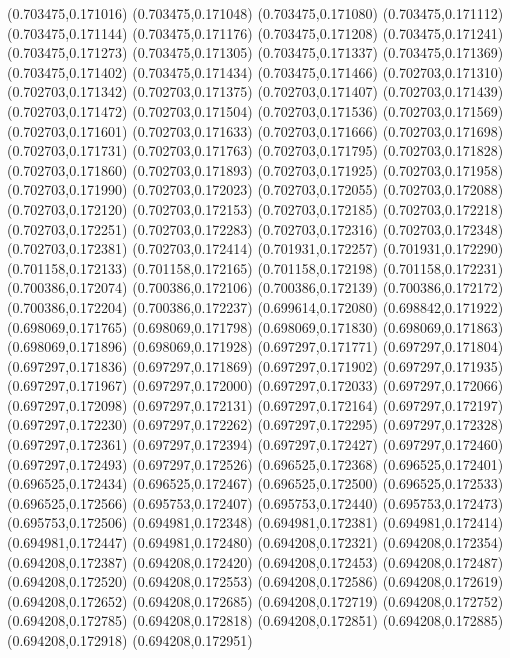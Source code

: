(0.703475,0.171016)
(0.703475,0.171048)
(0.703475,0.171080)
(0.703475,0.171112)
(0.703475,0.171144)
(0.703475,0.171176)
(0.703475,0.171208)
(0.703475,0.171241)
(0.703475,0.171273)
(0.703475,0.171305)
(0.703475,0.171337)
(0.703475,0.171369)
(0.703475,0.171402)
(0.703475,0.171434)
(0.703475,0.171466)
(0.702703,0.171310)
(0.702703,0.171342)
(0.702703,0.171375)
(0.702703,0.171407)
(0.702703,0.171439)
(0.702703,0.171472)
(0.702703,0.171504)
(0.702703,0.171536)
(0.702703,0.171569)
(0.702703,0.171601)
(0.702703,0.171633)
(0.702703,0.171666)
(0.702703,0.171698)
(0.702703,0.171731)
(0.702703,0.171763)
(0.702703,0.171795)
(0.702703,0.171828)
(0.702703,0.171860)
(0.702703,0.171893)
(0.702703,0.171925)
(0.702703,0.171958)
(0.702703,0.171990)
(0.702703,0.172023)
(0.702703,0.172055)
(0.702703,0.172088)
(0.702703,0.172120)
(0.702703,0.172153)
(0.702703,0.172185)
(0.702703,0.172218)
(0.702703,0.172251)
(0.702703,0.172283)
(0.702703,0.172316)
(0.702703,0.172348)
(0.702703,0.172381)
(0.702703,0.172414)
(0.701931,0.172257)
(0.701931,0.172290)
(0.701158,0.172133)
(0.701158,0.172165)
(0.701158,0.172198)
(0.701158,0.172231)
(0.700386,0.172074)
(0.700386,0.172106)
(0.700386,0.172139)
(0.700386,0.172172)
(0.700386,0.172204)
(0.700386,0.172237)
(0.699614,0.172080)
(0.698842,0.171922)
(0.698069,0.171765)
(0.698069,0.171798)
(0.698069,0.171830)
(0.698069,0.171863)
(0.698069,0.171896)
(0.698069,0.171928)
(0.697297,0.171771)
(0.697297,0.171804)
(0.697297,0.171836)
(0.697297,0.171869)
(0.697297,0.171902)
(0.697297,0.171935)
(0.697297,0.171967)
(0.697297,0.172000)
(0.697297,0.172033)
(0.697297,0.172066)
(0.697297,0.172098)
(0.697297,0.172131)
(0.697297,0.172164)
(0.697297,0.172197)
(0.697297,0.172230)
(0.697297,0.172262)
(0.697297,0.172295)
(0.697297,0.172328)
(0.697297,0.172361)
(0.697297,0.172394)
(0.697297,0.172427)
(0.697297,0.172460)
(0.697297,0.172493)
(0.697297,0.172526)
(0.696525,0.172368)
(0.696525,0.172401)
(0.696525,0.172434)
(0.696525,0.172467)
(0.696525,0.172500)
(0.696525,0.172533)
(0.696525,0.172566)
(0.695753,0.172407)
(0.695753,0.172440)
(0.695753,0.172473)
(0.695753,0.172506)
(0.694981,0.172348)
(0.694981,0.172381)
(0.694981,0.172414)
(0.694981,0.172447)
(0.694981,0.172480)
(0.694208,0.172321)
(0.694208,0.172354)
(0.694208,0.172387)
(0.694208,0.172420)
(0.694208,0.172453)
(0.694208,0.172487)
(0.694208,0.172520)
(0.694208,0.172553)
(0.694208,0.172586)
(0.694208,0.172619)
(0.694208,0.172652)
(0.694208,0.172685)
(0.694208,0.172719)
(0.694208,0.172752)
(0.694208,0.172785)
(0.694208,0.172818)
(0.694208,0.172851)
(0.694208,0.172885)
(0.694208,0.172918)
(0.694208,0.172951)
